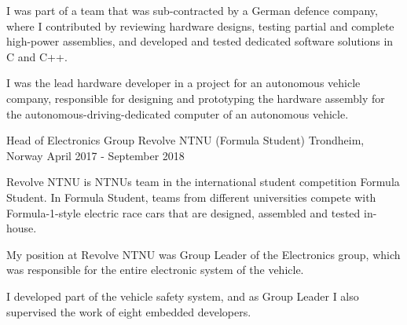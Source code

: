 \begin{cventries}
{\begin{cvitems}
            \item {I was part of a team that was sub-contracted by a German defence company, where I contributed by reviewing hardware designs, testing partial and complete high-power assemblies, and developed and tested dedicated software solutions in C and C++.}
            \item {I was the lead hardware developer in a project for an autonomous vehicle company, responsible for designing and prototyping the hardware assembly for the autonomous-driving-dedicated computer of an autonomous vehicle.}
          \end{cvitems}
        }
   \cventry
        {Head of Electronics Group}
        {Revolve NTNU (Formula Student)}
        {Trondheim, Norway}
        {April 2017 - September 2018}
        {
          \begin{cvitems}
            \item {Revolve NTNU is NTNUs team in the international student competition Formula Student. In Formula Student, teams from different universities compete with Formula-1-style electric race cars that are designed, assembled and tested in-house.}
            \item {My position at Revolve NTNU was Group Leader of the Electronics group, which was responsible for the entire electronic system of the vehicle.}
            \item {I developed part of the vehicle safety system, and as Group Leader I also supervised the work of eight embedded developers.}
          \end{cvitems}
        }
\end{cventries}
